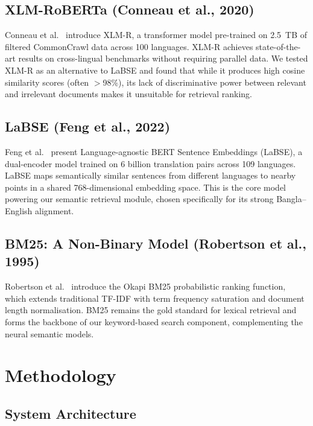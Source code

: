 \documentclass[12pt,a4paper]{article}
\begin{document}
\subsection{XLM-RoBERTa (Conneau et al., 2020)}
Conneau et al.~\cite{conneau2020} introduce XLM-R, a transformer model pre-trained on 2.5~TB of filtered CommonCrawl data across 100 languages. XLM-R achieves state-of-the-art results on cross-lingual benchmarks without requiring parallel data. We tested XLM-R as an alternative to LaBSE and found that while it produces high cosine similarity scores (often $>$98\%), its lack of discriminative power between relevant and irrelevant documents makes it unsuitable for retrieval ranking.

\subsection{LaBSE (Feng et al., 2022)}
Feng et al.~\cite{feng2022} present Language-agnostic BERT Sentence Embeddings (LaBSE), a dual-encoder model trained on 6 billion translation pairs across 109 languages. LaBSE maps semantically similar sentences from different languages to nearby points in a shared 768-dimensional embedding space. This is the core model powering our semantic retrieval module, chosen specifically for its strong Bangla--English alignment.

\subsection{BM25: A Non-Binary Model (Robertson et al., 1995)}
Robertson et al.~\cite{robertson1995} introduce the Okapi BM25 probabilistic ranking function, which extends traditional TF-IDF with term frequency saturation and document length normalisation. BM25 remains the gold standard for lexical retrieval and forms the backbone of our keyword-based search component, complementing the neural semantic models.

\section{Methodology}

\subsection{System Architecture}
\end{document}
